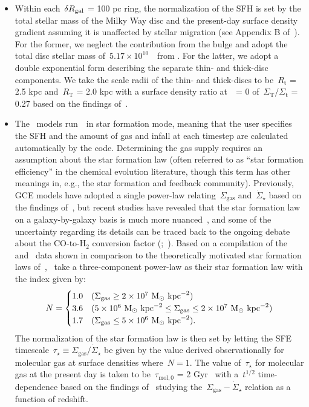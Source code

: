 \documentclass[ms.tex]{subfiles}
\begin{document}
\begin{itemize}
	\item Within each~$\delta R_\text{gal}$ = 100 pc ring, the normalization of the SFH 
	is set by the total stellar mass of the Milky Way disc and the present-day 
	surface density gradient assuming it is unaffected by stellar migration 
	(see Appendix B of~\citealt{Johnson2021}). 
	For the former, we neglect the contribution from the bulge and adopt the 
	total disc stellar mass of~$5.17\times10^{10}$~\msun~from 
	\citet{Licquia2015}. 
	For the latter, we adopt a double exponential form describing the separate 
	thin- and thick-disc components. 
	We take the scale radii of the thin- and thick-discs to be~$R_\text{t}$ = 
	2.5 kpc and~$R_\text{T}$ = 2.0 kpc with a surface density ratio at~\rgal~= 0 
	of~$\Sigma_\text{T}/\Sigma_\text{t}$ = 0.27 based on the findings 
	of~\citet{Bland-Hawthorn2016}. 

	\item The~\citet{Johnson2021} models run~\vice~in star formation mode, 
	meaning that the user specifies the SFH and the amount of gas and infall at 
	each timestep are calculated automatically by the code. 
	Determining the gas supply requires an assumption about the star formation 
	law (often referred to as ``star formation efficiency'' in the chemical 
	evolution literature, though this term has other meanings in, e.g., the 
	star formation and feedback community). 
	Previously, GCE models have adopted a single power-law 
	relating~$\Sigma_\text{gas}$ and~$\dot{\Sigma}_\star$ based on the 
	findings of~\citet{Kennicutt1998}, but recent studies have revealed that 
	the star formation law on a galaxy-by-galaxy basis is much more 
	nuanced~\citep{delosReyes2019, Ellison2021, Kennicutt2021}, and some of the 
	uncertainty regarding its details can be traced back to the ongoing debate 
	about the CO-to-H$_2$ conversion factor 
	(\citealp{Kennicutt2012};~\citealp*{Liu2015}). 
	Based on a compilation of the~\citet{Bigiel2010} and~\citet{Leroy2013} data 
	shown in comparison to the theoretically motivated star formation laws 
	of~\citet[][see their Fig. 2]{Krumholz2018},~\citet{Johnson2021} take a 
	three-component power-law as their star formation law with the index given 
	by: 
	\begin{equation} 
	N = \begin{cases} 
	1.0 & (\Sigma_\text{gas} \geq 2\times10^7~\text{M}_\odot~\text{kpc}^{-2}) 
	\\ 
	3.6 & (5\times10^6~\text{M}_\odot~\text{kpc}^{-2} \leq \Sigma_\text{gas} \leq 
	2\times10^7~\text{M}_\odot~\text{kpc}^{-2}) 
	\\ 
	1.7 & (\Sigma_\text{gas} \leq 5\times10^6~\text{M}_\odot~\text{kpc}^{-2}). 
	\end{cases} 
	\end{equation} 
	The normalization of the star formation law is then set by letting the 
	SFE timescale~$\tau_\star \equiv \Sigma_\text{gas} / \dot{\Sigma}_\star$ 
	be given by the value derived observationally for molecular gas at surface 
	densities where~$N = 1$. 
	The value of~$\tau_\star$ for molecular gas at the present day is taken to 
	be~$\tau_{\text{mol},0}$ = 2 Gyr~\citep{Leroy2008, Leroy2013} with 
	a~$t^{1/2}$ time-dependence based on the findings of~\citet{Tacconi2018} 
	studying the~$\Sigma_\text{gas}-\dot{\Sigma}_\star$ relation as a function 
	of redshift. 


\end{itemize}
\end{document}
